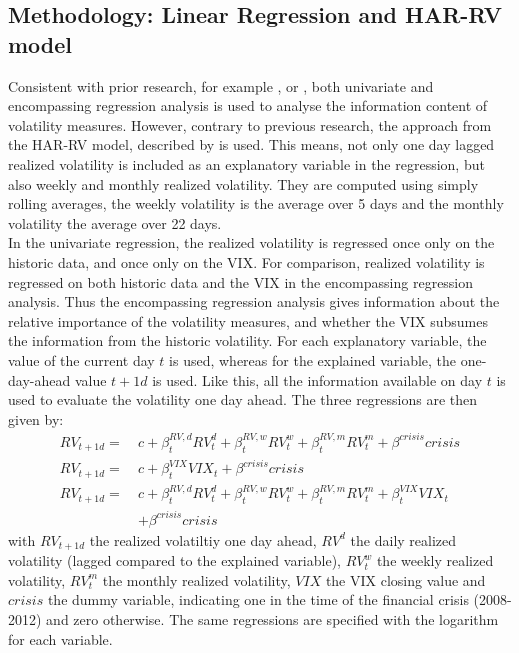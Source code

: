 \subsection{Methodology: Linear Regression and HAR-RV model}\label{sec:42Method}
Consistent with prior research, for example \textcite{jiang2003}, \textcite{canina1993} or \textcite{christensen1998}, both univariate and encompassing regression analysis is used to analyse the information content of volatility measures. However, contrary to previous research, the approach from the HAR-RV model, described by \textcite{Corsi2009} is used. This means, not only one day lagged realized volatility is included as an explanatory variable in the regression, but also weekly and monthly realized volatility. They are computed using simply rolling averages, the weekly volatility is the average over 5 days and the monthly volatility the average over 22 days.\\
In the univariate regression, the realized volatility is regressed once only on the historic data, and once only on the VIX. For comparison, realized volatility is regressed on both historic data and the VIX in the encompassing regression analysis. Thus the encompassing regression analysis gives information about the relative importance of the volatility measures, and whether the VIX subsumes the information from the historic volatility. For each explanatory variable, the value of the current day $t$ is used, whereas for the explained variable, the one-day-ahead value $t+1d$ is used. Like this, all the information available on day $t$ is used to evaluate the volatility one day ahead. The three regressions are then given by:
\begin{align}
RV_{t+1d} = \ &c + \beta^{RV,d}_{t} RV^{d}_{t} + \beta^{RV,w}_{t} RV^{w}_{t} + \beta^{RV,m}_{t} RV^{m}_{t} + \beta^{crisis} crisis \tag{Reg1a}  \label{eq:Reg1a}\\
RV_{t+1d} = \ &c + \beta^{VIX}_{t} VIX_{t} + \beta^{crisis} crisis  \tag{Reg2a}  \label{eq:Reg2a}\\
RV_{t+1d} = \ &c + \beta^{RV,d}_{t} RV^{d}_{t} + \beta^{RV,w}_{t} RV^{w}_{t} + \beta^{RV,m}_{t} RV^{m}_{t} + \beta^{VIX}_{t} VIX_{t}  \nonumber \\
& + \beta^{crisis} crisis  \tag{Reg3a}  \label{eq:Reg3a}
\end{align}
with $RV_{t+1d}$ the realized volatiltiy one day ahead, $RV^{d}$ the daily realized volatility (lagged compared to the explained variable), $RV^{w}_{t}$ the weekly realized volatility, $RV^{m}_{t}$ the monthly realized volatility, $VIX$ the VIX closing value and $crisis$ the dummy variable, indicating one in the time of the financial crisis (2008-2012) and zero otherwise. The same regressions are specified with the logarithm for each variable.
